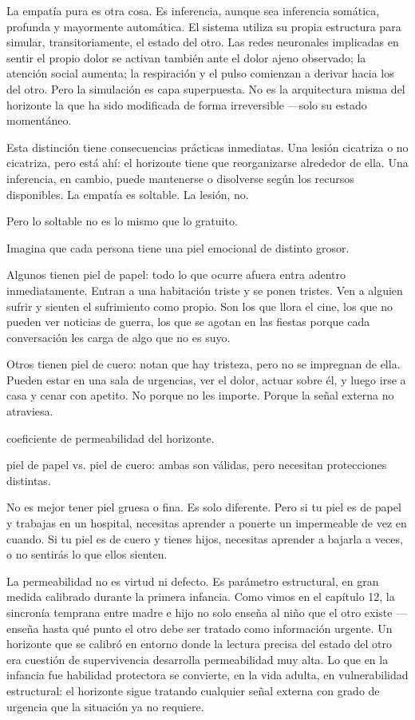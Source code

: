 La empatía pura es otra cosa. Es inferencia, aunque sea inferencia somática, profunda y mayormente automática. El sistema utiliza su propia estructura para simular, transitoriamente, el estado del otro. Las redes neuronales implicadas en sentir el propio dolor se activan también ante el dolor ajeno observado; la atención social aumenta; la respiración y el pulso comienzan a derivar hacia los del otro. Pero la simulación es capa superpuesta. No es la arquitectura misma del horizonte la que ha sido modificada de forma irreversible —solo su estado momentáneo.

Esta distinción tiene consecuencias prácticas inmediatas. Una lesión cicatriza o no cicatriza, pero está ahí: el horizonte tiene que reorganizarse alrededor de ella. Una inferencia, en cambio, puede mantenerse o disolverse según los recursos disponibles. La empatía es soltable. La lesión, no.

Pero lo soltable no es lo mismo que lo gratuito.

\noindent Imagina que cada persona tiene una piel emocional de distinto grosor.

Algunos tienen piel de papel: todo lo que ocurre afuera entra adentro inmediatamente. Entran a una habitación triste y se ponen tristes. Ven a alguien sufrir y sienten el sufrimiento como propio. Son los que llora el cine, los que no pueden ver noticias de guerra, los que se agotan en las fiestas porque cada conversación les carga de algo que no es suyo.

Otros tienen piel de cuero: notan que hay tristeza, pero no se impregnan de ella. Pueden estar en una sala de urgencias, ver el dolor, actuar sobre él, y luego irse a casa y cenar con apetito. No porque no les importe. Porque la señal externa no atraviesa.

\begin{fisica}
 coeficiente de permeabilidad del horizonte.

 piel de papel vs. piel de cuero: ambas son válidas, pero necesitan protecciones distintas.
\end{fisica}
No es mejor tener piel gruesa o fina. Es solo diferente. Pero si tu piel es de papel y trabajas en un hospital, necesitas aprender a ponerte un impermeable de vez en cuando. Si tu piel es de cuero y tienes hijos, necesitas aprender a bajarla a veces, o no sentirás lo que ellos sienten.

La permeabilidad no es virtud ni defecto. Es parámetro estructural, en gran medida calibrado durante la primera infancia. Como vimos en el capítulo 12, la sincronía temprana entre madre e hijo no solo enseña al niño que el otro existe —enseña hasta qué punto el otro debe ser tratado como información urgente. Un horizonte que se calibró en entorno donde la lectura precisa del estado del otro era cuestión de supervivencia desarrolla permeabilidad muy alta. Lo que en la infancia fue habilidad protectora se convierte, en la vida adulta, en vulnerabilidad estructural: el horizonte sigue tratando cualquier señal externa con grado de urgencia que la situación ya no requiere.

